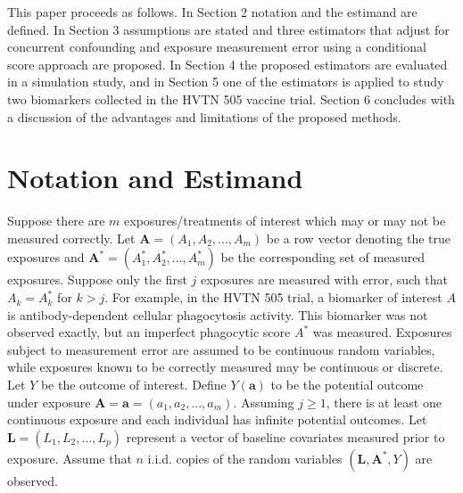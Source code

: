 \documentclass[useAMS,usenatbib,referee]{biom}
\begin{document}
This paper proceeds as follows. In Section 2 notation and the estimand are defined. In Section 3 assumptions are stated and three estimators that adjust for concurrent confounding and exposure measurement error using a conditional score approach are proposed. In Section 4 the proposed estimators are evaluated in a simulation study, and in Section 5 one of the estimators is applied to study two biomarkers collected in the HVTN 505 vaccine trial. Section 6 concludes with a discussion of the advantages and limitations of the proposed methods.

\section{Notation and Estimand}
\label{s:notation}

Suppose there are $m$ exposures/treatments of interest which may or may not be measured correctly. Let $\bm{A} = (A_{1}, A_{2}, ..., A_{m})$ be a row vector denoting the true exposures and $\bm{A}^{*} =  (A^{*}_{1}, A^{*}_{2}, ..., A^{*}_{m})$ be the corresponding set of measured exposures. Suppose only the first $j$ exposures are measured with error, such that $A_{k} = A^{*}_{k}$ for $k > j$. For example, in the HVTN 505 trial, a biomarker of interest $A$ is antibody-dependent cellular phagocytosis activity. This biomarker was not observed exactly, but an imperfect phagocytic score $A^{*}$ was measured. Exposures subject to measurement error are assumed to be continuous random variables, while exposures known to be correctly measured may be continuous or discrete. Let $Y$ be the outcome of interest. Define $Y(\bm{a})$ to be the potential outcome under exposure $\bm{A} = \bm{a} = (a_{1}, a_{2}, ..., a_{m})$. Assuming $j \geq 1$, there is at least one continuous exposure and each individual has infinite potential outcomes. Let $\bm{L} =  (L_{1}, L_{2}, ..., L_{p})$ represent a vector of baseline covariates measured prior to exposure. Assume that $n$ i.i.d. copies of the random variables $(\bm{L}, \bm{A}^{*}, Y)$ are observed.
\end{document}
